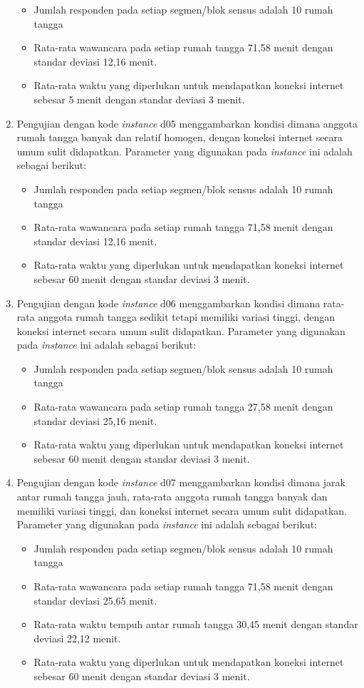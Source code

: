 \begin{enumerate}
	\begin{itemize}
		\item Jumlah responden pada setiap segmen/blok sensus adalah 10 rumah tangga
		\item Rata-rata wawancara pada setiap rumah tangga 71,58 menit dengan standar deviasi 12,16 menit.
		\item Rata-rata waktu yang diperlukan untuk mendapatkan koneksi internet sebesar 5 menit dengan standar deviasi 3 menit.
	\end{itemize}
	\item Pengujian dengan kode \textit{instance} d05 menggambarkan kondisi dimana anggota rumah tangga banyak dan relatif homogen, dengan koneksi internet secara umum sulit didapatkan. Parameter yang digunakan pada \textit{instance} ini adalah sebagai berikut:
	\begin{itemize}
		\item Jumlah responden pada setiap segmen/blok sensus adalah 10 rumah tangga
		\item Rata-rata wawancara pada setiap rumah tangga 71,58 menit dengan standar deviasi 12,16 menit.
		\item Rata-rata waktu yang diperlukan untuk mendapatkan koneksi internet sebesar 60 menit dengan standar deviasi 3 menit.
	\end{itemize}
	\item Pengujian dengan kode \textit{instance} d06 menggambarkan kondisi dimana rata-rata anggota rumah tangga sedikit tetapi memiliki variasi tinggi, dengan koneksi internet secara umum sulit didapatkan. Parameter yang digunakan pada \textit{instance} ini adalah sebagai berikut:
	\begin{itemize}
		\item Jumlah responden pada setiap segmen/blok sensus adalah 10 rumah tangga
		\item Rata-rata wawancara pada setiap rumah tangga 27,58 menit dengan standar deviasi 25,16 menit.
		\item Rata-rata waktu yang diperlukan untuk mendapatkan koneksi internet sebesar 60 menit dengan standar deviasi 3 menit.
	\end{itemize}
	\item Pengujian dengan kode \textit{instance} d07 menggambarkan kondisi dimana jarak antar rumah tangga jauh, rata-rata anggota rumah tangga banyak dan memiliki variasi tinggi, dan koneksi internet secara umum sulit didapatkan. Parameter yang digunakan pada \textit{instance} ini adalah sebagai berikut:
	\begin{itemize}
		\item Jumlah responden pada setiap segmen/blok sensus adalah 10 rumah tangga
		\item Rata-rata wawancara pada setiap rumah tangga 71,58 menit dengan standar deviasi 25,65 menit.
		\item Rata-rata waktu tempuh antar rumah tangga 30,45 menit dengan standar deviasi 22,12 menit.
		\item Rata-rata waktu yang diperlukan untuk mendapatkan koneksi internet sebesar 60 menit dengan standar deviasi 3 menit.
	\end{itemize}
\end{enumerate}


